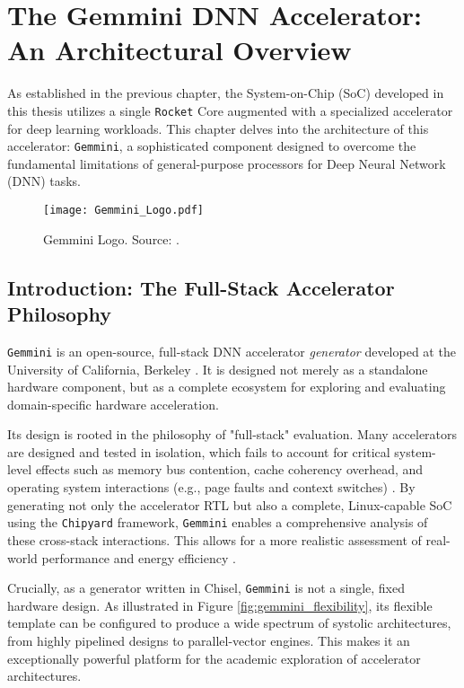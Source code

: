 \chapter{The Gemmini DNN Accelerator: An Architectural Overview}
\label{chap:gemmini_overview}

As established in the previous chapter, the System-on-Chip (SoC) developed in this thesis utilizes a single \texttt{Rocket} Core augmented with a specialized accelerator for deep learning workloads. This chapter delves into the architecture of this accelerator: \texttt{Gemmini}, a sophisticated component designed to overcome the fundamental limitations of general-purpose processors for Deep Neural Network (DNN) tasks.

\begin{figure}[htbp]
    \centering
    \texttt{[image: Gemmini\_Logo.pdf]}
    \caption{Gemmini Logo. Source: \cite{gemini-dac}.}
    \label{fig:gemmini_logo}
\end{figure}

\section{Introduction: The Full-Stack Accelerator Philosophy}
\label{sec:gemmini_intro}

\texttt{Gemmini} is an open-source, full-stack DNN accelerator \textit{generator} developed at the University of California, Berkeley \cite{gemini-dac}. It is designed not merely as a standalone hardware component, but as a complete ecosystem for exploring and evaluating domain-specific hardware acceleration. 

Its design is rooted in the philosophy of "full-stack" evaluation. Many accelerators are designed and tested in isolation, which fails to account for critical system-level effects such as memory bus contention, cache coherency overhead, and operating system interactions (e.g., page faults and context switches) \cite{gemini-dac}. By generating not only the accelerator RTL but also a complete, Linux-capable SoC using the \texttt{Chipyard} framework, \texttt{Gemmini} enables a comprehensive analysis of these cross-stack interactions. This allows for a more realistic assessment of real-world performance and energy efficiency \cite{gemini-dac}.

Crucially, as a generator written in Chisel, \texttt{Gemmini} is not a single, fixed hardware design. As illustrated in Figure \ref{fig:gemmini_flexibility}, its flexible template can be configured to produce a wide spectrum of systolic architectures, from highly pipelined designs to parallel-vector engines. This makes it an exceptionally powerful platform for the academic exploration of accelerator architectures.

